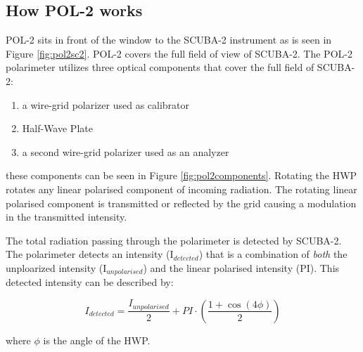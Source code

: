 \subsection*{How POL-2 works}

POL-2 sits in front of the window to the SCUBA-2 instrument
as is seen in Figure \ref{fig:pol2sc2}. POL-2 covers the full
field of view of SCUBA-2. The POL-2 polarimeter
utilizes three optical components
that cover the full field of SCUBA-2: 

\begin{enumerate}\itemsep-0.2em
\item a wire-grid polarizer used as calibrator
\item Half-Wave Plate
\item a second wire-grid polarizer used as an analyzer
\end{enumerate}


these components can be seen in Figure \ref{fig:pol2components}.
Rotating the HWP rotates any linear polarised component of incoming
radiation. The rotating linear polarised component is
transmitted or reflected by the grid causing a modulation in the transmitted
intensity. 

The total radiation passing through the polarimeter is detected by
SCUBA-2. The polarimeter detects an intensity (I$_{detected}$) that is a
combination of \emph{both} the unploarized intensity (I$_{unpolarised}$)
and the linear polarised intensity (PI). This detected intensity can be
described by:


\begin{equation}
I_{detected} = \frac{I_{unpolarised}}{2}+ PI\cdot\left(\frac{1+\cos(4\phi)}{2} \right)
\end{equation}

where $\phi$ is the angle of the HWP.

